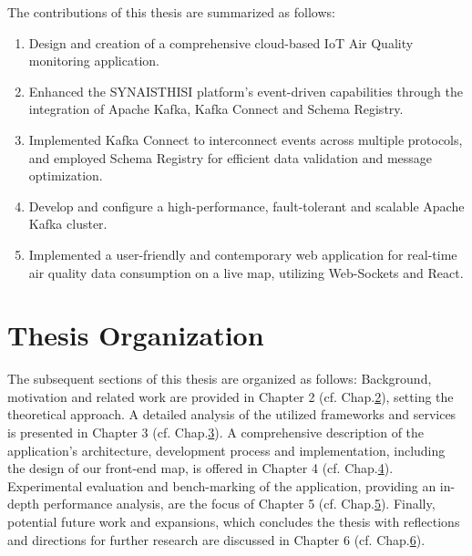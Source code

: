 The contributions of this thesis are summarized as follows:
\begin{enumerate}
\item Design and creation of a comprehensive cloud-based IoT Air Quality monitoring application.
\item Enhanced the SYNAISTHISI platform's event-driven capabilities through the integration of Apache Kafka, Kafka Connect and Schema Registry.
\item Implemented Kafka Connect to interconnect events across multiple protocols, and employed Schema Registry for efficient data validation and message optimization.
\item Develop and configure a high-performance, fault-tolerant and scalable Apache Kafka cluster.
\item Implemented a user-friendly and contemporary web application for real-time air quality data consumption on a live map, utilizing Web-Sockets and React.
\end{enumerate}


\section{Thesis Organization}

The subsequent sections of this thesis are organized as follows: Background, motivation and related work are provided in Chapter 2 (cf. Chap.\hyperref[chap2]{2}), setting the theoretical approach. A detailed analysis of the utilized frameworks and services is presented in Chapter 3 (cf. Chap.\hyperref[chap3]{3}). A comprehensive description of the application's architecture, development process and implementation, including the design of our front-end map, is offered in Chapter 4 (cf. Chap.\hyperref[chap4]{4}). Experimental evaluation and bench-marking of the application, providing an in-depth performance analysis, are the focus of Chapter 5 (cf. Chap.\hyperref[chap5]{5}). Finally, potential future work and expansions, which concludes the thesis with reflections and directions for further research are discussed in Chapter 6 (cf. Chap.\hyperref[chap6]{6}).